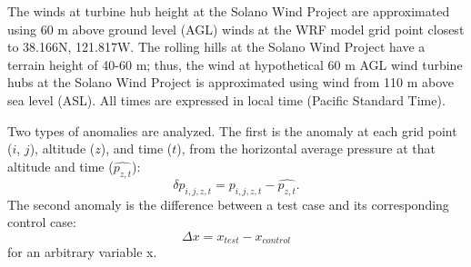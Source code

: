 The winds at turbine hub height at the Solano Wind Project are approximated using 60 m above ground level (AGL) winds at the WRF model grid point closest to 38.166N, 121.817W.  The rolling hills at the Solano Wind Project have a terrain height of 40-60 m; thus, the wind at hypothetical 60 m AGL wind turbine hubs at the Solano Wind Project is approximated using wind from 110 m above sea level (ASL).  All times are expressed in local time (Pacific Standard Time).

Two types of anomalies are analyzed.  The first is the anomaly at each grid point ($i$, $j$), altitude ($z$), and time ($t$), from the horizontal average pressure at that altitude and time ($\widehat{p_{z, t}}$):
\begin{equation}
\delta p_{i, j, z, t} = p_{i, j, z, t} - \widehat{p_{z, t}}.
\end{equation}
The second anomaly is the difference between a test case and its corresponding control case:
\begin{equation}
\Delta x = x_{test} - x_{control}
\end{equation}
for an arbitrary variable x.


%